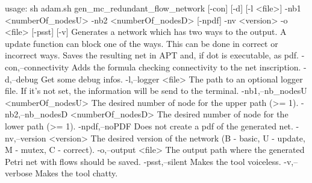usage: sh adam.sh gen_mc_redundant_flow_network [-con] [-d] [-l <file>]
       -nb1 <numberOf_nodesU> -nb2 <numberOf_nodesD> [-npdf] -nv <version>
       -o <file> [-psst] [-v]
Generates a network which has two ways to the output. A update function
can block one of the ways. This can be done in correct or incorrect ways.
Saves the resulting net in APT and, if dot is executable, as pdf.
 -con,--connectivity                  Adds the formula checking
                                      connectivity to the net inscription.
 -d,--debug                           Get some debug infos.
 -l,--logger <file>                   The path to an optional logger file.
                                      If it's not set, the information
                                      will be send to the terminal.
 -nb1,--nb_nodesU <numberOf_nodesU>   The desired number of node for the
                                      upper path (>= 1).
 -nb2,--nb_nodesD <numberOf_nodesD>   The desired number of node for the
                                      lower path (>= 1).
 -npdf,--noPDF                        Does not create a pdf of the
                                      generated net.
 -nv,--version <version>              The desired version of the network
                                      (B - basic, U - update, M - mutex, C
                                      - correct).
 -o,--output <file>                   The output path where the generated
                                      Petri net with flows should be
                                      saved.
 -psst,--silent                       Makes the tool voiceless.
 -v,--verbose                         Makes the tool chatty.
